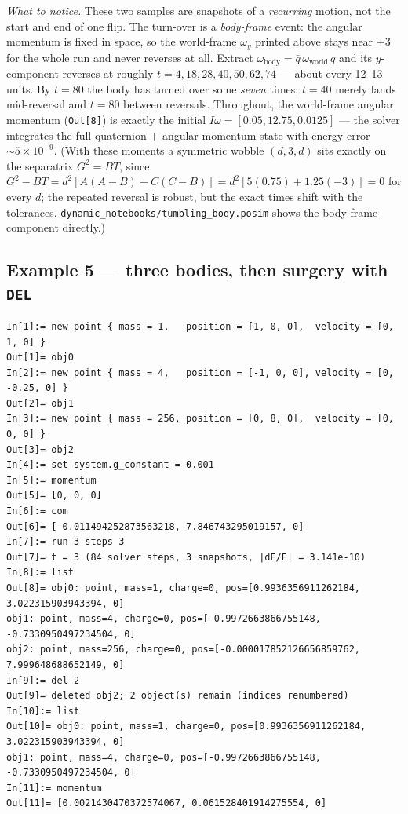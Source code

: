 \documentclass[11pt]{article}
\newcommand{\kw}[1]{\texttt{\uppercase{#1}}}
\newcommand{\code}[1]{\texttt{#1}}
\begin{document}
\emph{What to notice.} These two samples are snapshots of a
\emph{recurring} motion, not the start and end of one flip. The
turn-over is a \emph{body-frame} event: the angular momentum is fixed in
space, so the world-frame $\omega_y$ printed above stays near $+3$ for
the whole run and never reverses at all. Extract
$\omega_{\text{body}} = \bar{q}\,\omega_{\text{world}}\,q$ and its
$y$-component reverses at roughly $t = 4, 18, 28, 40, 50, 62, 74$ ---
about every 12--13 units. By $t=80$ the body has turned over some
\emph{seven} times; $t=40$ merely lands mid-reversal and $t=80$ between
reversals. Throughout, the world-frame angular momentum
(\code{Out[8]}) is exactly the initial
$I\omega = [0.05, 12.75, 0.0125]$ --- the solver integrates the full
quaternion + angular-momentum state with energy error
$\sim 5\times10^{-9}$. (With these moments a symmetric wobble
$(d, 3, d)$ sits exactly on the separatrix $G^2 = BT$, since
$G^2 - BT = d^2[A(A-B) + C(C-B)] = d^2[5(0.75) + 1.25(-3)] = 0$ for
every $d$; the repeated reversal is robust, but the exact times shift
with the tolerances. \code{dynamic\_notebooks/tumbling\_body.posim}
shows the body-frame component directly.)

\subsection{Example 5 --- three bodies, then surgery with \kw{del}}

\begin{lstlisting}
In[1]:= new point { mass = 1,   position = [1, 0, 0],  velocity = [0, 1, 0] }
Out[1]= obj0
In[2]:= new point { mass = 4,   position = [-1, 0, 0], velocity = [0, -0.25, 0] }
Out[2]= obj1
In[3]:= new point { mass = 256, position = [0, 8, 0],  velocity = [0, 0, 0] }
Out[3]= obj2
In[4]:= set system.g_constant = 0.001
In[5]:= momentum
Out[5]= [0, 0, 0]
In[6]:= com
Out[6]= [-0.011494252873563218, 7.846743295019157, 0]
In[7]:= run 3 steps 3
Out[7]= t = 3 (84 solver steps, 3 snapshots, |dE/E| = 3.141e-10)
In[8]:= list
Out[8]= obj0: point, mass=1, charge=0, pos=[0.9936356911262184, 3.022315903943394, 0]
obj1: point, mass=4, charge=0, pos=[-0.9972663866755148, -0.7330950497234504, 0]
obj2: point, mass=256, charge=0, pos=[-0.000017852126656859762, 7.999648688652149, 0]
In[9]:= del 2
Out[9]= deleted obj2; 2 object(s) remain (indices renumbered)
In[10]:= list
Out[10]= obj0: point, mass=1, charge=0, pos=[0.9936356911262184, 3.022315903943394, 0]
obj1: point, mass=4, charge=0, pos=[-0.9972663866755148, -0.7330950497234504, 0]
In[11]:= momentum
Out[11]= [0.0021430470372574067, 0.061528401914275554, 0]
\end{lstlisting}
\end{document}

